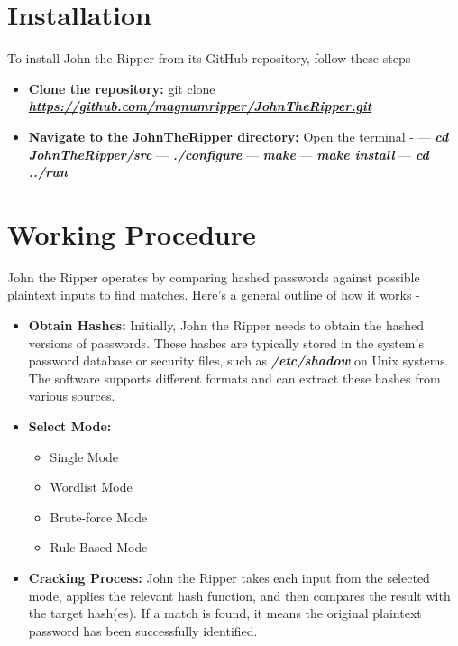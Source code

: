 \documentclass[12pt, A4Paper]{article}
\begin{document}
\section{Installation}
To install John the Ripper from its GitHub repository, follow these steps - 

\begin{itemize}
    \item {\textbf{Clone the repository:}} \newline
   git clone \href{https://github.com/magnumripper/JohnTheRipper.git}{\textbf{\textit{https://github.com/magnumripper/JohnTheRipper.git}}}
    \item {\textbf{Navigate to the JohnTheRipper directory:}}  \newline
    Open the terminal -  \newline
    --- \textbf{\textit{cd JohnTheRipper/src}} \newline
    --- \textbf{\textit{./configure}} \newline
    --- \textbf{\textit{make}} \newline
    --- \textbf{\textit{make install}} \newline
    --- \textbf{\textit{cd ../run}} \newline

    
\end{itemize}
\vspace{0.4cm}


\section{Working Procedure}
John the Ripper operates by comparing hashed passwords against possible plaintext inputs to find matches. Here's a general outline of how it works -

\begin{itemize}
    \item \textbf{Obtain Hashes:} \newline
  Initially, John the Ripper needs to obtain the hashed versions of passwords. These hashes are typically stored in the system's password database or security files, such as \textbf{\textit{/etc/shadow}} on Unix systems. The software supports different formats and can extract these hashes from various sources.
    \item {\textbf{Select Mode:}}
    \begin{itemize}
        \item Single Mode
        \item Wordlist Mode
        \item Brute-force Mode
        \item Rule-Based Mode
    \end{itemize}

    \item \textbf{Cracking Process:} John the Ripper takes each input from the selected mode, applies the relevant hash function, and then compares the result with the target hash(es). If a match is found, it means the original plaintext password has been successfully identified.
\end{itemize}
\vspace{0.4cm}
\end{document}
